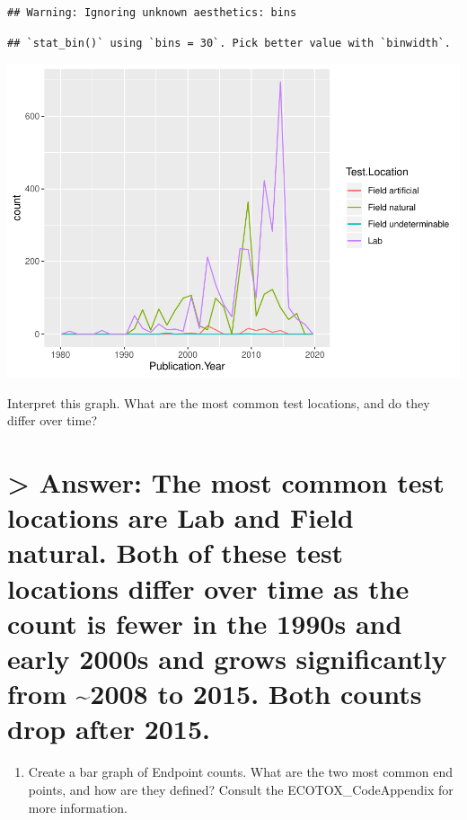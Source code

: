 \documentclass[]{article}
\providecommand{\tightlist}{%
  \setlength{\itemsep}{0pt}\setlength{\parskip}{0pt}}
\begin{document}
\begin{verbatim}
## Warning: Ignoring unknown aesthetics: bins
\end{verbatim}

\begin{verbatim}
## `stat_bin()` using `bins = 30`. Pick better value with `binwidth`.
\end{verbatim}

\includegraphics{A03_DataExploration_files/figure-latex/unnamed-chunk-7-1.pdf}

Interpret this graph. What are the most common test locations, and do
they differ over time?

\section{\textgreater{} Answer: The most common test locations are Lab
and Field natural. Both of these test locations differ over time as the
count is fewer in the 1990s and early 2000s and grows significantly from
\textasciitilde{}2008 to 2015. Both counts drop after
2015.}\label{answer-the-most-common-test-locations-are-lab-and-field-natural.-both-of-these-test-locations-differ-over-time-as-the-count-is-fewer-in-the-1990s-and-early-2000s-and-grows-significantly-from-2008-to-2015.-both-counts-drop-after-2015.}

\begin{enumerate}
\def\labelenumi{\arabic{enumi}.}
\setcounter{enumi}{10}
\tightlist
\item
  Create a bar graph of Endpoint counts. What are the two most common
  end points, and how are they defined? Consult the ECOTOX\_CodeAppendix
  for more information.
\end{enumerate}
\end{document}
